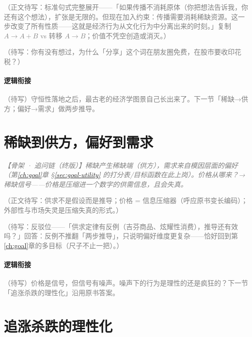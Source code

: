\documentclass[../../main2.tex]{subfiles}
\begin{document}
	\textcolor{gray}{（正文待写：标准句式完整展开——「如果传播不消耗原体（你把想法告诉我，你还有这个想法），扩张是无限的。但现在加入约束：传播需要消耗稀缺资源。这一步改变了所有性质——这就是经济行为从文化行为中分离出来的时刻。」复制 $A \to A+B$ vs 转移 $A \to B$；价值不凭空创造或消灭。）}

	\begin{readingnote}
		\textcolor{gray}{（待写：你有没有想过，为什么「分享」这个词在朋友圈免费，在股市要收印花税？）}
	\end{readingnote}

	\paragraph*{逻辑衔接}
	\textcolor{gray}{（待写）守恒性落地之后，最古老的经济学图景自己长出来了。下一节「稀缺→供方；偏好→需求」做两步推导。}

	\section{稀缺到供方，偏好到需求}
	\label{sec:econ-supplydemand}

	\textcolor{gray}{\textit{【骨架 · 追问链（终版）】稀缺产生稀缺端（供方），需求来自模因层面的偏好（第\ref{ch:goal}章 §\ref{sec:goal-utility} 的打分表/目标函数在此上岗）。价格从哪来？→ 稀缺信号——价格是压缩进一个数字的供需信息，且会失真。}}

	\textcolor{gray}{（正文待写：供求不是假设而是推导；价格 = 信息压缩器（呼应原书变长编码）；外部性与市场失灵是压缩失真的形式。）}

	\begin{questionbox}
		\textcolor{gray}{（待写：反驳位——「供求定律有反例（吉芬商品、炫耀性消费），推导还有效吗？」回答：反例不推翻「两步推导」，只说明偏好维度更复杂——恰好回到第\ref{ch:goal}章的多目标（尺子不止一把）。）}
	\end{questionbox}

	\paragraph*{逻辑衔接}
	\textcolor{gray}{（待写）价格是信号，但信号有噪声。噪声下的行为是理性的还是疯狂的？下一节「追涨杀跌的理性化」沿用原书答案。}

	\section{追涨杀跌的理性化}
	\label{sec:econ-herding}
\end{document}
